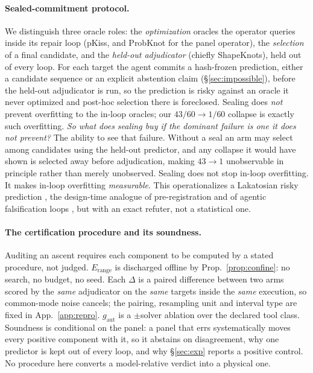 \documentclass[11pt]{article}
\begin{document}
\paragraph{Sealed-commitment protocol.} We distinguish three oracle roles: the \emph{optimization} oracles the
operator queries inside its repair loop (pKiss, and ProbKnot for the panel operator), the \emph{selection} of a
final candidate, and the \emph{held-out adjudicator} (chiefly ShapeKnots), held out of every loop. For each
target the agent commits a hash-frozen prediction, either a candidate sequence or an explicit abstention claim
(\S\ref{sec:impossible}), before the held-out adjudicator is run, so the prediction is risky against an oracle
it never optimized and post-hoc selection there is foreclosed. Sealing does \emph{not} prevent overfitting to
the in-loop oracles; our $43/60\!\to\!1/60$ collapse is exactly such overfitting. \emph{So what does sealing buy
if the dominant failure is one it does not prevent?} The ability to see that failure. Without a seal an arm may
select among candidates using the held-out predictor, and any collapse it would have shown is selected away
before adjudication, making $43\!\to\!1$ unobservable in principle rather than merely unobserved. Sealing does not stop in-loop overfitting. It makes in-loop overfitting \emph{measurable}. This operationalizes a Lakatosian
risky prediction \citep{popper1959,lakatos1978}, the design-time analogue of pre-registration and of agentic
falsification loops \citep{huang2025popper,liu2024aigs}, but with an exact refuter, not a statistical one.

\paragraph{The certification procedure and its soundness.} Auditing an ascent requires each component to be computed by a stated procedure, not judged. $E_{\mathrm{range}}$ is discharged offline by
Prop.~\ref{prop:confine}: no search, no budget, no seed. Each $\Delta$ is a paired difference between two arms
scored by the \emph{same} adjudicator on the \emph{same} targets inside the \emph{same} execution, so
common-mode noise cancels; the pairing, resampling unit and interval type are fixed in App.~\ref{app:repro}.
$g_{\mathrm{aut}}$ is a $\pm$solver ablation over the declared tool class. Soundness is conditional on the
panel: a panel that errs systematically moves every positive component with it, so it abstains on disagreement, why one predictor is kept out of every loop, and why \S\ref{sec:exp} reports a positive control.
No procedure here converts a model-relative verdict into a physical one.
\end{document}
